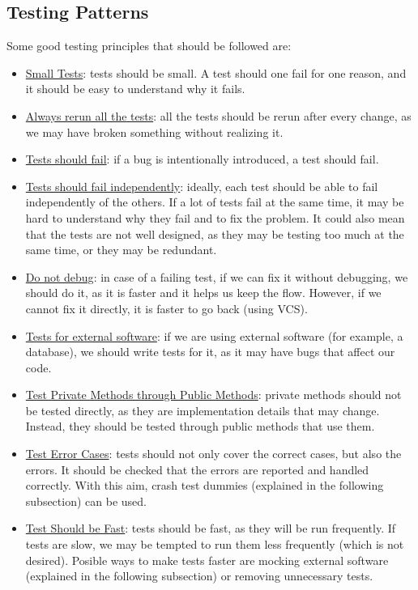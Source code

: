 \subsection{Testing Patterns}

Some good testing principles that should be followed are:
\begin{itemize}
    \item \ul{Small Tests}: tests should be small. A test should one fail for one reason, and it should be easy to understand why it fails.
    \item \ul{Always rerun all the tests}: all the tests should be rerun after every change, as we may have broken something without realizing it.
    \item \ul{Tests should fail}: if a bug is intentionally introduced, a test should fail.
    \item \ul{Tests should fail independently}: ideally, each test should be able to fail independently of the others. If a lot of tests fail at the same time, it may be hard to understand why they fail and to fix the problem. It could also mean that the tests are not well designed, as they may be testing too much at the same time, or they may be redundant.
    \item \ul{Do not debug}: in case of a failing test, if we can fix it without debugging, we should do it, as it is faster and it helps us keep the flow. However, if we cannot fix it directly, it is faster to go back (using VCS).
    \item \ul{Tests for external software}: if we are using external software (for example, a database), we should write tests for it, as it may have bugs that affect our code.
    \item \ul{Test Private Methods through Public Methods}: private methods should not be tested directly, as they are implementation details that may change. Instead, they should be tested through public methods that use them.
    \item \ul{Test Error Cases}: tests should not only cover the correct cases, but also the errors. It should be checked that the errors are reported and handled correctly. With this aim, crash test dummies (explained in the following subsection) can be used.
    \item \ul{Test Should be Fast}: tests should be fast, as they will be run frequently. If tests are slow, we may be tempted to run them less frequently (which is not desired). Posible ways to make tests faster are mocking external software (explained in the following subsection) or removing unnecessary tests.

\end{itemize}
